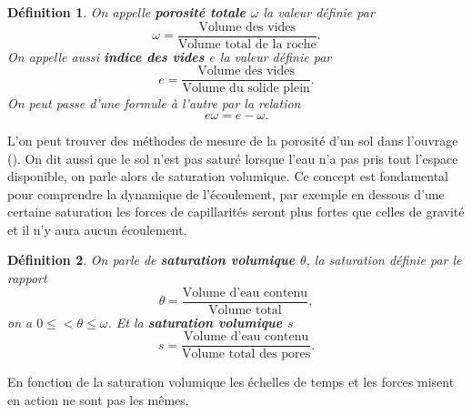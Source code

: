\documentclass[a4paper,11pt]{article}
\numberwithin{equation}{section}
\newtheorem{definition}{Définition}
\begin{document}
\begin{definition}
	On appelle \textbf{porosité totale $\omega$} la valeur définie par
	\begin{equation}
		\omega =\frac{\textrm{Volume des vides}}{\textrm{Volume total de la roche}}.
	\end{equation}
	On appelle aussi \textbf{indice des vides $e$} la valeur définie par 
	\begin{equation}
		e=\frac{\textrm{Volume des vides}}{\textrm{Volume du solide plein}}.
	\end{equation}
	On peut passe d'une formule à l'autre par la relation 
	\[e\omega=e-\omega.\]
\end{definition}
L'on peut trouver des méthodes de mesure de la porosité d'un sol dans l'ouvrage (\cite{marsily_de1986quantitative}). On dit aussi que le sol n'est pas saturé lorsque l'eau n'a pas pris tout l'espace disponible, on parle alors de saturation volumique. Ce concept est fondamental pour comprendre la dynamique de l'écoulement, par exemple en dessous d'une certaine saturation les forces de capillarités seront plus fortes que celles de gravité et il n'y aura aucun écoulement.
 
\begin{definition}
	On parle de \textbf{saturation volumique $\theta$}, la saturation définie par le rapport
	\begin{equation}
		\theta= \frac{\textrm{Volume d'eau contenu}}{\textrm{Volume total}},
	\end{equation}
	on a $0\leq<\theta\leq \omega$. Et la \textbf{saturation volumique $s$}
	\begin{equation}
		s=\frac{\textrm{Volume d'eau contenu}}{\textrm{Volume total des pores}}.
	\end{equation}
\end{definition}

En fonction de la saturation volumique les échelles de temps et les forces misent en action ne sont pas les mêmes.
\end{document}
